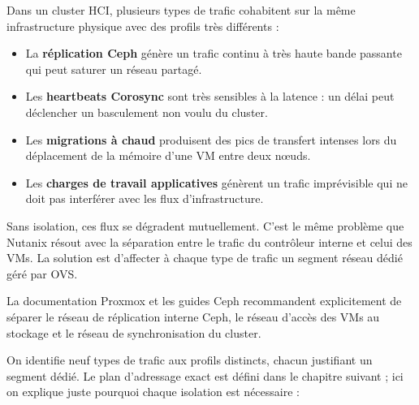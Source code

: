 
\par Dans un cluster HCI, plusieurs types de trafic cohabitent sur la même infrastructure physique avec des profils très différents :\\

\begin{itemize}

    \item La \textbf{réplication Ceph} génère un trafic continu à très haute bande passante qui peut saturer un réseau partagé.

    \item Les \textbf{heartbeats Corosync} sont très sensibles à la latence : un délai peut déclencher un basculement non voulu du cluster.

    \item Les \textbf{migrations à chaud} produisent des pics de transfert intenses lors du déplacement de la mémoire d'une VM entre deux n\oe{}uds.

    \item Les \textbf{charges de travail applicatives} génèrent un trafic imprévisible qui ne doit pas interférer avec les flux d'infrastructure.

\end{itemize}

\par Sans isolation, ces flux se dégradent mutuellement. C'est le même problème que Nutanix résout avec la séparation entre le trafic du contrôleur interne et celui des VMs. La solution est d'affecter à chaque type de trafic un segment réseau dédié géré par OVS.\\

\par La documentation Proxmox et les guides Ceph recommandent explicitement de séparer le réseau de réplication interne Ceph, le réseau d'accès des VMs au stockage et le réseau de synchronisation du cluster.\\


\par On identifie neuf types de trafic aux profils distincts, chacun justifiant un segment dédié. Le plan d'adressage exact est défini dans le chapitre suivant ; ici on explique juste pourquoi chaque isolation est nécessaire :\\

